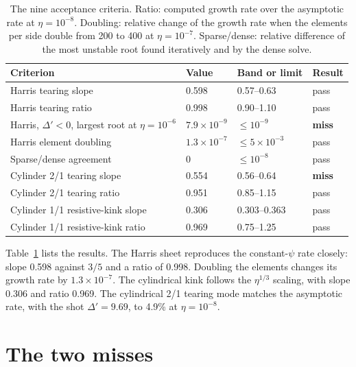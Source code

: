 \documentclass[11pt]{article}
\begin{document}
\begin{table}[ht]
\centering
\caption{The nine acceptance criteria.  Ratio: computed growth rate over the
asymptotic rate at $\eta = 10^{-8}$.  Doubling: relative change of the growth
rate when the elements per side double from 200 to 400 at $\eta = 10^{-7}$.
Sparse/dense: relative difference of the most unstable root found iteratively
and by the dense solve.}
\label{tab:criteria}
\small
\begin{tabular}{llll}
\toprule
Criterion & Value & Band or limit & Result \\
\midrule
Harris tearing slope & 0.598 & 0.57--0.63 & pass \\
Harris tearing ratio & 0.998 & 0.90--1.10 & pass \\
Harris, $\Delta' < 0$, largest root at $\eta = 10^{-6}$ & $7.9 \times 10^{-9}$ & $\le 10^{-9}$ & \textbf{miss} \\
Harris element doubling & $1.3 \times 10^{-7}$ & $\le 5 \times 10^{-3}$ & pass \\
Sparse/dense agreement & 0 & $\le 10^{-8}$ & pass \\
Cylinder 2/1 tearing slope & 0.554 & 0.56--0.64 & \textbf{miss} \\
Cylinder 2/1 tearing ratio & 0.951 & 0.85--1.15 & pass \\
Cylinder 1/1 resistive-kink slope & 0.306 & 0.303--0.363 & pass \\
Cylinder 1/1 resistive-kink ratio & 0.969 & 0.75--1.25 & pass \\
\bottomrule
\end{tabular}
\end{table}

Table~\ref{tab:criteria} lists the results.  The Harris sheet reproduces the
constant-$\psi$ rate closely: slope 0.598 against $3/5$ and a ratio of 0.998.
Doubling the elements changes its growth rate by $1.3 \times 10^{-7}$.  The
cylindrical kink follows the $\eta^{1/3}$ scaling, with slope 0.306 and ratio
0.969.  The cylindrical 2/1 tearing mode matches the asymptotic rate, with the
shot $\Delta' = 9.69$, to 4.9\% at $\eta = 10^{-8}$.

\section{The two misses}
\end{document}
